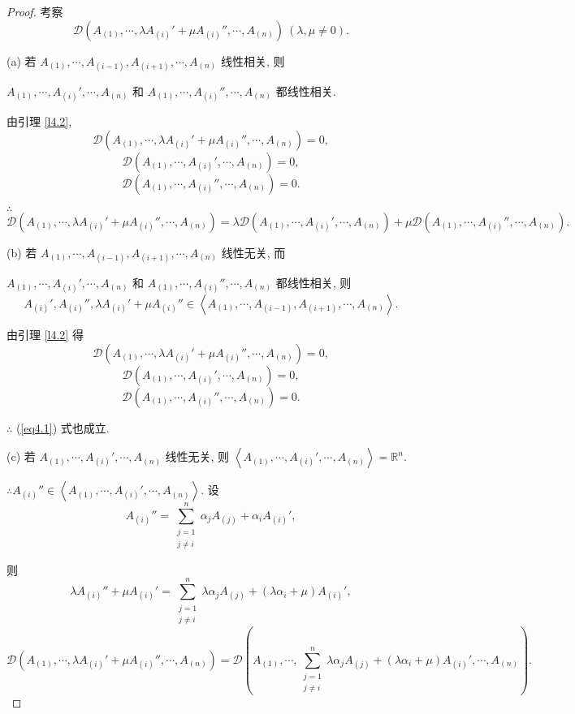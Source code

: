 \documentclass{ctexart}
\begin{document}
\begin{proof}
    考察
    \[\mathcal{D}(A_{(1)},\cdots,\lambda A_{(i)}'+\mu A_{(i)}'',\cdots,A_{(n)})\ (\lambda,\mu\neq0).\]

    (a) 若 $A_{(1)},\cdots,A_{(i-1)},A_{(i+1)},\cdots,A_{(n)}$ 线性相关, 则
    
    $A_{(1)},\cdots,A_{(i)}',\cdots,A_{(n)}$ 和 $A_{(1)},\cdots,A_{(i)}'',\cdots,A_{(n)}$ 都线性相关.
    
    由引理 \ref{l4.2},
    \[\mathcal{D}(A_{(1)},\cdots,\lambda A_{(i)}'+\mu A_{(i)}'',\cdots,A_{(n)})=0,\]
    \[\mathcal{D}(A_{(1)},\cdots,A_{(i)}',\cdots,A_{(n)})=0,\]
    \[\mathcal{D}(A_{(1)},\cdots,A_{(i)}'',\cdots,A_{(n)})=0.\]

    $\therefore$
    \begin{equation}\label{eq4.1}
        \mathcal{D}(A_{(1)},\cdots,\lambda A_{(i)}'+\mu A_{(i)}'',\cdots,A_{(n)})=\lambda\mathcal{D}(A_{(1)},\cdots,A_{(i)}',\cdots,A_{(n)})+\mu\mathcal{D}(A_{(1)},\cdots,A_{(i)}'',\cdots,A_{(n)}).
    \end{equation}

    (b) 若 $A_{(1)},\cdots,A_{(i-1)},A_{(i+1)},\cdots,A_{(n)}$ 线性无关, 而
    
    $A_{(1)},\cdots,A_{(i)}',\cdots,A_{(n)}$ 和 $A_{(1)},\cdots,A_{(i)}'',\cdots,A_{(n)}$ 都线性相关, 则
    \[A_{(i)}',A_{(i)}'',\lambda A_{(i)}'+\mu A_{(i)}''\in\left<A_{(1)},\cdots,A_{(i-1)},A_{(i+1)},\cdots,A_{(n)}\right>.\]

    由引理 \ref{l4.2} 得
    \[\mathcal{D}(A_{(1)},\cdots,\lambda A_{(i)}'+\mu A_{(i)}'',\cdots,A_{(n)})=0,\]
    \[\mathcal{D}(A_{(1)},\cdots,A_{(i)}',\cdots,A_{(n)})=0,\]
    \[\mathcal{D}(A_{(1)},\cdots,A_{(i)}'',\cdots,A_{(n)})=0.\]

    $\therefore$ (\ref{eq4.1}) 式也成立.

    (c) 若 $A_{(1)},\cdots,A_{(i)}',\cdots,A_{(n)}$ 线性无关, 则 $\left<A_{(1)},\cdots,A_{(i)}',\cdots,A_{(n)}\right>=\mathbb{R}^n.$

    $\therefore A_{(i)}''\in\left<A_{(1)},\cdots,A_{(i)}',\cdots,A_{(n)}\right>$. 设
    \[A_{(i)}''=\sum\limits_{\substack{j=1\\j\neq i}}^{n}\alpha_jA_{(j)}+\alpha_iA_{(i)}',\]

    则
    \[\lambda A_{(i)}''+\mu A_{(i)}'=\sum\limits_{\substack{j=1\\j\neq i}}^{n}\lambda\alpha_jA_{(j)}+(\lambda\alpha_i+\mu)A_{(i)}',\]
    \[\mathcal{D}(A_{(1)},\cdots,\lambda A_{(i)}'+\mu A_{(i)}'',\cdots,A_{(n)})=\mathcal{D}\left(A_{(1)},\cdots,\sum\limits_{\substack{j=1\\j\neq i}}^{n}\lambda\alpha_jA_{(j)}+(\lambda\alpha_i+\mu)A_{(i)}',\cdots,A_{(n)}\right).\]


\end{proof}
\end{document}
